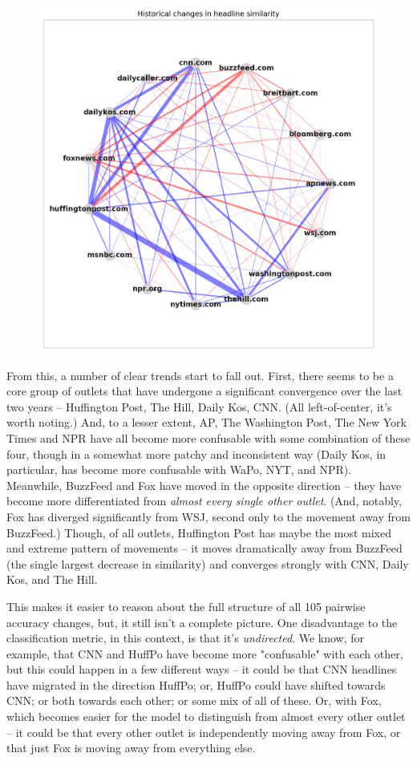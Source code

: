 \documentclass{scrartcl}
\begin{document}
\begin{figure}[H]
  \centering
  \includegraphics[height=0.5\textheight]{figures/ts-ab-radial.png}
\end{figure}

From this, a number of clear trends start to fall out. First, there seems to be a core group of outlets that have undergone a significant convergence over the last two years -- Huffington Post, The Hill, Daily Kos, CNN. (All left-of-center, it's worth noting.) And, to a lesser extent, AP, The Washington Post, The New York Times and NPR have all become more confusable with some combination of these four, though in a somewhat more patchy and inconsistent way (Daily Kos, in particular, has become more confusable with WaPo, NYT, and NPR). Meanwhile, BuzzFeed and Fox have moved in the opposite direction -- they have become more differentiated from \textit{almost every single other outlet}. (And, notably, Fox has diverged significantly from WSJ, second only to the movement away from BuzzFeed.) Though, of all outlets, Huffington Post has maybe the most mixed and extreme pattern of movements -- it moves dramatically away from BuzzFeed (the single largest decrease in similarity) and converges strongly with CNN, Daily Kos, and The Hill.

This makes it easier to reason about the full structure of all 105 pairwise accuracy changes, but, it still isn't a complete picture. One disadvantage to the classification metric, in this context, is that it's \textit{undirected}. We know, for example, that CNN and HuffPo have become more "confusable" with each other, but this could happen in a few different ways -- it could be that CNN headlines have migrated in the direction HuffPo; or, HuffPo could have shifted towards CNN; or both towards each other; or some mix of all of these. Or, with Fox, which becomes easier for the model to distinguish from almost every other outlet -- it could be that every other outlet is independently moving away from Fox, or that just Fox is moving away from everything else.
\end{document}
